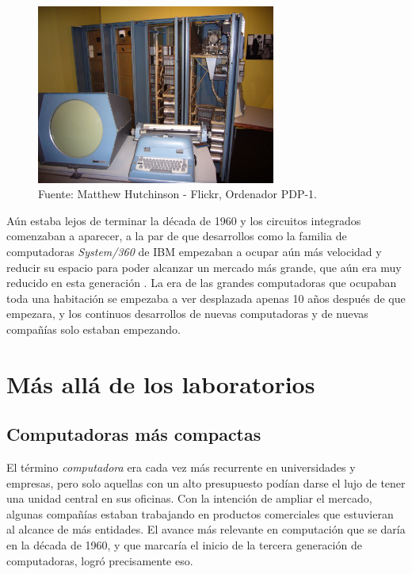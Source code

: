 \documentclass[letterpaper,12pt,oneside]{book}
\begin{document}
		\begin{figure}
		    \centering
		    \includegraphics[width=0.7\textwidth]{media/Historia/Wikimedia_PDP-1.jpeg}
		    \caption{Fuente: Matthew Hutchinson - Flickr, Ordenador PDP-1.} %
	    	\label{fig:pdp1}
		\end{figure}
		
		Aún estaba lejos de terminar la década de 1960 y los circuitos integrados comenzaban a aparecer, a la par de que desarrollos como la familia
		de computadoras \textit{System/360} de IBM empezaban a ocupar aún más velocidad y reducir su espacio para poder alcanzar un mercado más grande, que aún era
		muy reducido en esta generación \cite{oregan_brief_2012}. La era de las grandes computadoras que ocupaban toda una habitación se empezaba a ver desplazada apenas 10 
		años después de que 	
		empezara, y los continuos desarrollos de nuevas computadoras y de nuevas compañías solo estaban empezando.
				
	\section{Más allá de los laboratorios}
		\subsection{Computadoras más compactas}
		

		El término \textit{computadora}	era cada vez más recurrente en universidades y empresas, pero solo aquellas con un alto presupuesto podían
		darse el lujo de tener una unidad central en sus oficinas. Con la intención de ampliar el mercado, algunas compañías estaban trabajando en productos
		comerciales que estuvieran al alcance de más entidades. El avance más relevante en computación que se daría en la década de 1960, y que marcaría el inicio de la tercera generación
		de computadoras, logró precisamente eso. 
  
\end{document}
